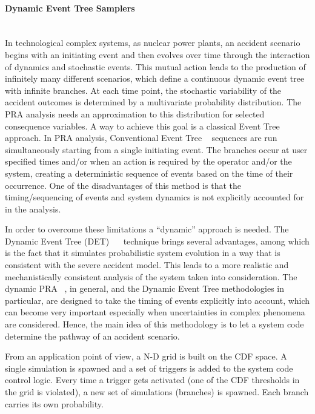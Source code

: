 \paragraph{Dynamic Event Tree Samplers}~\\
In technological complex systems, as nuclear power plants, an accident scenario begins with an initiating event and then evolves over time through the interaction of dynamics and stochastic events. This mutual action leads to the production of infinitely many different scenarios, which define a continuous dynamic event tree with infinite branches. At each time point, the stochastic variability of the accident outcomes is determined by a multivariate probability distribution. The PRA analysis needs an approximation to this distribution for selected consequence variables. A way to achieve this goal is a classical Event Tree approach. In PRA analysis, Conventional Event Tree ~\cite{alfonsiPSA} sequences are run simultaneously starting from a single initiating event. The branches occur at user specified times and/or when an action is required by the operator and/or the system, creating a deterministic sequence of events based on the time of their occurrence. One of the disadvantages of this method is that the timing/sequencing of events and system dynamics is not explicitly accounted for in the analysis.

In order to overcome these limitations a “dynamic” approach is needed. The Dynamic Event Tree (DET) ~\cite{alfonsiPSA15}~\cite{ANS2014alfADET}  technique brings several advantages, among which is the fact that it simulates probabilistic system evolution in a way that is consistent with the severe accident model. This leads to a more realistic and mechanistically consistent analysis of the system taken into consideration. The dynamic PRA ~\cite{alfonsiPSA}, in general, and the Dynamic Event Tree methodologies in particular, are designed to take the timing of events explicitly into account, which can become very important especially when uncertainties in complex phenomena are considered. Hence, the main idea of this methodology is to let a system code determine the pathway of an accident scenario.

From an application point of view, a N-D grid is built on the CDF space. A single simulation is spawned and a set of triggers is added to the system code control logic. Every time a trigger gets activated (one of the CDF thresholds in the grid is violated), a new set of simulations (branches) is spawned. Each branch carries its own probability.

